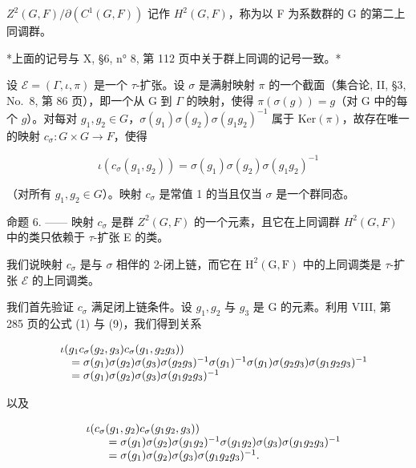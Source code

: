 \(Z^{2}(G,F)/\partial(C^{1}(G,F))\) 记作 \(H^{2}(G,F)\)，称为以 F 为系数群的 G 的第二上同调群。

*上面的记号与 X, §6, n° 8, 第 112 页中关于群上同调的记号一致。*

设 \(\mathcal{E} = (\Gamma, \iota, \pi)\) 是一个 \(\tau\)-扩张。设 \(\sigma\) 是满射映射 \(\pi\) 的一个截面（集合论, II, §3, No.~8, 第 86 页），即一个从 G 到 \(\Gamma\) 的映射，使得 \(\pi(\sigma(g)) = g\)（对 G 中的每个 \(g\)）。对每对 \(g_1, g_2 \in G\)，\(\sigma(g_1)\sigma(g_2)\sigma(g_1g_2)^{-1}\) 属于 \(\mathrm{Ker}(\pi)\)，故存在唯一的映射 \(c_\sigma: G \times G \to F\)，使得

\[
\iota (c _ {\sigma} (g _ {1}, g _ {2})) = \sigma (g _ {1}) \sigma (g _ {2}) \sigma (g _ {1} g _ {2}) ^ {- 1}\tag{9}
\]

（对所有 \(g_{1}, g_{2} \in G\)）。映射 \(c_{\sigma}\) 是常值 1 的当且仅当 \(\sigma\) 是一个群同态。

命题 6. —— 映射 \(c_{\sigma}\) 是群 \(Z^{2}(G,F)\) 的一个元素，且它在上同调群 \(H^{2}(G,F)\) 中的类只依赖于 \(\tau\)-扩张 E 的类。

我们说映射 \(c_{\sigma}\) 是与 \(\sigma\) 相伴的 2-闭上链，而它在 \(\mathrm{H}^2 (\mathrm{G},\mathrm{F})\) 中的上同调类是 \(\tau\)-扩张 \(\mathcal{E}\) 的上同调类。

我们首先验证 \(c_{\sigma}\) 满足闭上链条件。设 \(g_{1}, g_{2}\) 与 \(g_{3}\) 是 G 的元素。利用 VIII, 第 285 页的公式 (1) 与 (9)，我们得到关系

\[
\begin{array}{r l} & {\iota (g _ {1} c _ {\sigma} (g _ {2}, g _ {3}) c _ {\sigma} (g _ {1}, g _ {2} g _ {3}))} \\ & {\quad = \sigma (g _ {1}) \sigma (g _ {2}) \sigma (g _ {3}) \sigma (g _ {2} g _ {3}) ^ {- 1} \sigma (g _ {1}) ^ {- 1} \sigma (g _ {1}) \sigma (g _ {2} g _ {3}) \sigma (g _ {1} g _ {2} g _ {3}) ^ {- 1}} \\ & {\quad = \sigma (g _ {1}) \sigma (g _ {2}) \sigma (g _ {3}) \sigma (g _ {1} g _ {2} g _ {3}) ^ {- 1}} \end{array}
\]

以及

\[
\begin{array}{r l} & {\iota (c _ {\sigma} (g _ {1}, g _ {2}) c _ {\sigma} (g _ {1} g _ {2}, g _ {3}))} \\ & {\qquad = \sigma (g _ {1}) \sigma (g _ {2}) \sigma (g _ {1} g _ {2}) ^ {- 1} \sigma (g _ {1} g _ {2}) \sigma (g _ {3}) \sigma (g _ {1} g _ {2} g _ {3}) ^ {- 1}} \\ & {\qquad = \sigma (g _ {1}) \sigma (g _ {2}) \sigma (g _ {3}) \sigma (g _ {1} g _ {2} g _ {3}) ^ {- 1}.} \end{array}
\]

